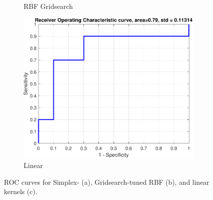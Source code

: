 \documentclass{article}
\begin{document}
\begin{figure}[h]
\begin{subfigure}[b]{0.3\textwidth}
                    \caption{RBF Gridsearch}
                     \label{fig:roc_rbf_gridsearch_tuned}
                 \end{subfigure}
                 \hfill
                 \begin{subfigure}[b]{0.3\textwidth}
                     \centering
                     \includegraphics[width=\textwidth]{Assignment 1/figures/linear_classifier_roc.pdf}
                    \caption{Linear}
                     \label{fig:roc_linear}
                 \end{subfigure}
                \caption{ROC curves for Simplex- (a), Gridsearch-tuned RBF (b), and linear kernels (c). }
            \end{figure}
            
        
\end{document}
